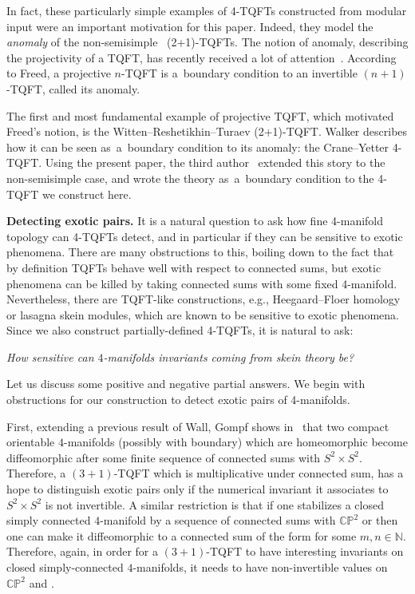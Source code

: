 \documentclass[pdftex]{sigma}
\numberwithin{equation}{section}
\numberwithin{theorem}{section}
\numberwithin{proposition}{section}
\numberwithin{definition}{section}
\numberwithin{lemma}{section}
\numberwithin{corollary}{section}
\numberwithin{remark}{section}
\numberwithin{example}{section}
\newcommand{\N}{\ensuremath{\mathbb{N}}}
\newcommand{\CP}{\mathbb{CP}}
\newcounter{exo} \newcounter{numexercice}
\begin{document}
In fact, these particularly simple examples of 4-TQFTs constructed from modular input were an important motivation for this paper. Indeed, they model the \emph{anomaly} of the non-semisimple~\cite{DRGGPMR2022} (2+1)-TQFTs. The notion of anomaly, describing the projectivity of a TQFT,
has
recently received a lot of attention~\cite{FreedAnomalyInvFT, FreedAnomaly}. According to Freed, a projective $n$-TQFT is a~boundary condition to an invertible $(n+1)$-TQFT, called its anomaly.

The first and most fundamental example of projective TQFT, which motivated Freed's notion, is the Witten--Reshetikhin--Turaev (2+1)-TQFT. Walker describes how it can be seen as~a~boundary condition to its anomaly: the Crane--Yetter 4-TQFT. Using the present paper, the third author~\cite{HaiounWRT} extended this story to the non-semisimple case, and wrote \cite{DRGGPMR2022} the theory as~a~boundary condition to the 4-TQFT we construct here.

\textbf{Detecting exotic pairs.}
It is a natural question to ask how fine 4-manifold topology can 4-TQFTs detect, and in particular if they can be sensitive to exotic phenomena. There are many obstructions to this, boiling down to the fact that by
definition TQFTs behave well with respect to connected sums,
but exotic phenomena can be killed by taking connected sums with some fixed 4-manifold. Nevertheless, there are TQFT-like constructions, e.g., Heegaard--Floer homology or lasagna skein modules, which are known to be sensitive to exotic phenomena. Since we also construct partially-defined 4-TQFTs, it is natural to ask:
\begin{center}
 \it How sensitive can $4$-manifolds invariants coming from skein theory be?
\end{center}
Let us discuss some positive and negative partial answers. We begin with obstructions for our construction to detect exotic pairs of 4-manifolds.

First, extending a previous result of Wall,
Gompf shows in~\cite{Go}
that two compact orientable $4$-manifolds (possibly with boundary) which are homeomorphic become diffeomorphic after some finite sequence of connected sums with $S^2\times S^2$. Therefore, a $(3+1)$-TQFT which is multiplicative under connected sum, has a hope to distinguish exotic pairs only if the numerical invariant it associates to $S^2\times S^2$ is not invertible.
A similar restriction is that if one stabilizes a closed simply connected $4$-manifold by a sequence of connected sums with $\CP^2$ or \smash{$\overline{\CP^2}$} then one can make it diffeomorphic to a connected sum of the form \smash{$\#_m\CP^2\#_n\overline{\CP^2}$} for some $m,n\in \N$. Therefore, again, in order for a $(3+1)$-TQFT to have interesting invariants on closed simply-connected $4$-manifolds, it needs to have non-invertible values on $\CP^2$ and \smash{$\overline{\CP^2}$}.
\end{document}
